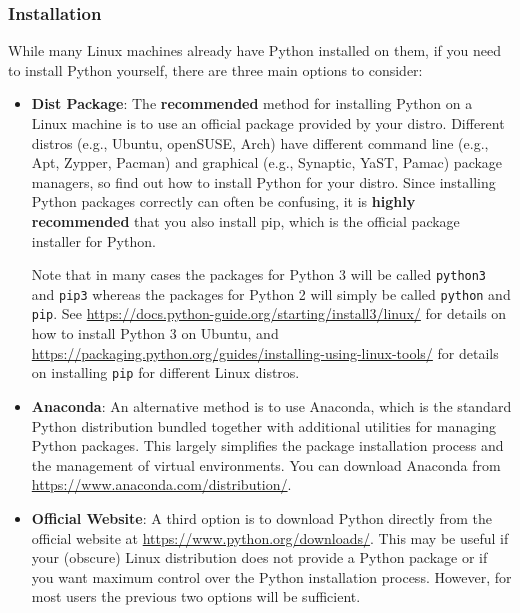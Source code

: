 \documentclass[12pt]{article}
\begin{document}
\subsubsection{Installation}
While many Linux machines already have Python installed on them, if you need to install Python yourself, there are three main options to consider:
\begin{itemize}
    \item \textbf{Dist Package}: The \textbf{recommended} method for installing Python on a Linux machine is to use an official package provided by your distro. Different distros (e.g., Ubuntu, openSUSE, Arch) have different command line (e.g., Apt, Zypper, Pacman) and graphical (e.g., Synaptic, YaST, Pamac) package managers, so find out how to install Python for your distro. Since installing Python packages correctly can often be confusing, it is \textbf{highly recommended} that you also install pip, which is the official package installer for Python.
        
        Note that in many cases the packages for Python 3 will be called \texttt{python3} and \texttt{pip3} whereas the packages for Python 2 will simply be called \texttt{python} and \texttt{pip}. See \url{https://docs.python-guide.org/starting/install3/linux/} for details on how to install Python 3 on Ubuntu, and \url{https://packaging.python.org/guides/installing-using-linux-tools/} for details on installing \texttt{pip} for different Linux distros.
    \item \textbf{Anaconda}: An alternative method is to use Anaconda, which is the standard Python distribution bundled together with additional utilities for managing Python packages. This largely simplifies the package installation process and the management of virtual environments. You can download Anaconda from \url{https://www.anaconda.com/distribution/}.
    \item \textbf{Official Website}: A third option is to download Python directly from the official website at \url{https://www.python.org/downloads/}. This may be useful if your (obscure) Linux distribution does not provide a Python package or if you want maximum control over the Python installation process. However, for most users the previous two options will be sufficient.
\end{itemize}
\end{document}
